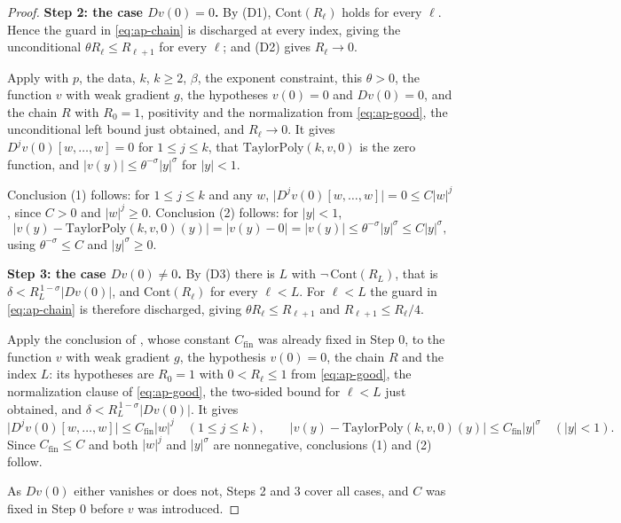\begin{proof}
\medskip\noindent\textbf{Step 2: the case $Dv(0)=0$.}
By (D1), $\mathrm{Cont}(R_\ell)$ holds for every $\ell$.  Hence the guard in
\eqref{eq:ap-chain} is discharged at every index, giving the unconditional
$\theta R_\ell\le R_{\ell+1}$ for every $\ell$; and (D2) gives $R_\ell\to0$.

Apply  with $p$, the data, $k$, $k\ge2$, $\beta$, the exponent
constraint, this $\theta>0$, the function $v$ with weak gradient $g$, the hypotheses $v(0)=0$
and $Dv(0)=0$, and the chain $R$ with $R_0=1$, positivity and the normalization from
\eqref{eq:ap-good}, the unconditional left bound just obtained, and $R_\ell\to0$.  It gives
$D^{j}v(0)[w,\ldots,w]=0$ for $1\le j\le k$, that $\mathrm{TaylorPoly}(k,v,0)$ is the zero
function, and $\lvert v(y)\rvert\le\theta^{-\sigma}\lvert y\rvert^{\sigma}$ for
$\lvert y\rvert<1$.

Conclusion (1) follows: for $1\le j\le k$ and any $w$,
$\lvert D^{j}v(0)[w,\ldots,w]\rvert=0\le C\lvert w\rvert^{j}$, since $C>0$ and
$\lvert w\rvert^{j}\ge0$.  Conclusion (2) follows: for $\lvert y\rvert<1$,
\[
  \bigl\lvert v(y)-\mathrm{TaylorPoly}(k,v,0)(y)\bigr\rvert=\lvert v(y)-0\rvert=\lvert v(y)\rvert
  \le\theta^{-\sigma}\lvert y\rvert^{\sigma}\le C\lvert y\rvert^{\sigma},
\]
using $\theta^{-\sigma}\le C$ and $\lvert y\rvert^{\sigma}\ge0$.

\medskip\noindent\textbf{Step 3: the case $Dv(0)\ne0$.}
By (D3) there is $L$ with $\neg\,\mathrm{Cont}(R_L)$, that is
$\delta<R_L^{\,1-\sigma}\lvert Dv(0)\rvert$, and $\mathrm{Cont}(R_\ell)$ for every $\ell<L$.
For $\ell<L$ the guard in \eqref{eq:ap-chain} is therefore discharged, giving
$\theta R_\ell\le R_{\ell+1}$ and $R_{\ell+1}\le R_\ell/4$.

Apply the conclusion of , whose constant $C_{\mathrm{fin}}$ was
already fixed in Step 0, to the function $v$ with weak gradient $g$, the hypothesis $v(0)=0$,
the chain $R$ and the index $L$: its hypotheses are $R_0=1$ with $0<R_\ell\le1$ from
\eqref{eq:ap-good}, the normalization clause of \eqref{eq:ap-good}, the two-sided bound for
$\ell<L$ just obtained, and $\delta<R_L^{\,1-\sigma}\lvert Dv(0)\rvert$.  It gives
\[
  \bigl\lvert D^{j}v(0)[w,\ldots,w]\bigr\rvert\le C_{\mathrm{fin}}\lvert w\rvert^{j}
  \quad(1\le j\le k),
  \qquad
  \bigl\lvert v(y)-\mathrm{TaylorPoly}(k,v,0)(y)\bigr\rvert\le
    C_{\mathrm{fin}}\lvert y\rvert^{\sigma}\quad(\lvert y\rvert<1).
\]
Since $C_{\mathrm{fin}}\le C$ and both $\lvert w\rvert^{j}$ and $\lvert y\rvert^{\sigma}$ are
nonnegative, conclusions (1) and (2) follow.

\medskip\noindent As $Dv(0)$ either vanishes or does not, Steps 2 and 3 cover all cases, and
$C$ was fixed in Step 0 before $v$ was introduced.
\end{proof}
